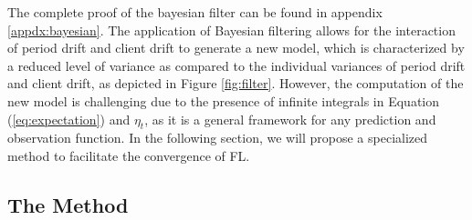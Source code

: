 The complete proof of the bayesian filter can be found in appendix \ref{appdx:bayesian}. The application of Bayesian filtering allows for the interaction of period drift and client drift to generate a new model, 
which is characterized by a reduced level of variance as compared to the individual variances of period drift and client drift, as depicted in Figure \ref{fig:filter}.
However, the computation of the new model is challenging due to the presence of infinite integrals in Equation (\ref{eq:expectation}) and $\eta_t$, as it is a general framework for any prediction and observation function. In the following section, we will propose a specialized method to facilitate the convergence of FL.


\subsection{The \fedeve Method}


